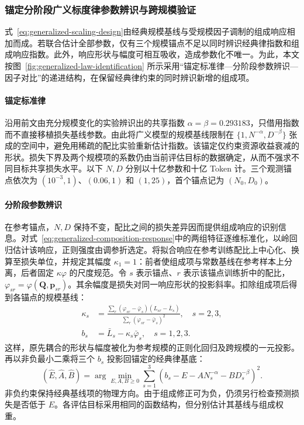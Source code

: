 \documentclass[bwprint]{gmcmthesis}
\begin{document}
\subsubsection{锚定分阶段广义标度律参数辨识与跨规模验证}

式~\eqref{eq:generalized-scaling-design}由经典规模基线与受规模因子调制的组成响应相加而成。若联合估计全部参数，仅有三个规模锚点不足以同时辨识经典律指数和组成响应指数。此外，响应形状与幅度可相互吸收，造成参数化不唯一。为此，本文按图~\ref{fig:generalized-law-identification} 所示采用“锚定标准律—分阶段参数辨识—因子对比”的递进结构，在保留经典律约束的同时辨识新增的组成项。


\paragraph{锚定标准律}
沿用前文由充分规模变化的实验辨识出的共享指数 $\alpha=\beta=0.293183$，只借用指数而不直接移植损失基线参数。由此将广义模型的规模基线限制在 $\{1,N^{-\alpha},D^{-\beta}\}$ 张成的空间中，避免用稀疏的配比实验重新估计指数。该锚定仅约束资源收益衰减的形状。损失下界及两个规模项的系数仍由当前评估目标的数据确定，从而不强求不同目标共享损失水平。以下 $N,D$ 分别以十亿参数和十亿 Token 计。三个观测锚点依次为 $(10^{-3},1)$、$(0.06,1)$ 和 $(1,25)$，首个锚点记为 $(N_0,D_0)$。

\paragraph{分阶段参数辨识}
在参考锚点，$N,D$ 保持不变，配比之间的损失差异因而提供组成响应的识别信息。对式~\eqref{eq:generalized-composition-response}中的两组特征逐维标准化，以岭回归估计该响应，正则强度由调参折选定。将拟合响应在参考训练配比上中心化、换算至损失单位，并规定其幅度 $\kappa_1=1$：前者使组成项与常数基线在参考样本上分离，后者固定 $\kappa\varphi$ 的尺度规范。令 $s$ 表示锚点、$r$ 表示该锚点训练折中的配比，$\varphi_{sr}=\varphi(\mathbf Q,\mathbf p_{sr})$。其余幅度是损失对同一响应形状的投影斜率。扣除组成项后得到各锚点的规模基线：
\begin{equation}
    \begin{aligned}
        \kappa_s & =\frac{\sum_r(\varphi_{sr}-\bar\varphi_s)(L_{sr}-\bar L_s)}
        {\sum_r(\varphi_{sr}-\bar\varphi_s)^2},\quad s=2,3,                    \\
        b_s      & =\bar L_s-\kappa_s\bar\varphi_s,\quad s=1,2,3.
    \end{aligned}
    \label{eq:generalized-stagewise-projection}
\end{equation}
这样，原先耦合的形状与幅度被化为参考规模的正则化回归及跨规模的一元投影。再以非负最小二乘将三个 $b_s$ 投影回锚定的经典律基底：
\begin{equation}
    (\widehat E,\widehat A,\widehat B)
    =\arg\min_{E,A,B\geq0}\sum_{s=1}^{3}
    \left(b_s-E-A N_s^{-\alpha}-B D_s^{-\beta}\right)^2.
    \label{eq:generalized-baseline-identification}
\end{equation}
非负约束保持经典基线项的物理方向。由于组成修正可为负，仍须另行检查预测损失是否低于 $E$。各评估目标采用相同的函数结构，但分别估计其基线与组成权重。
\end{document}
